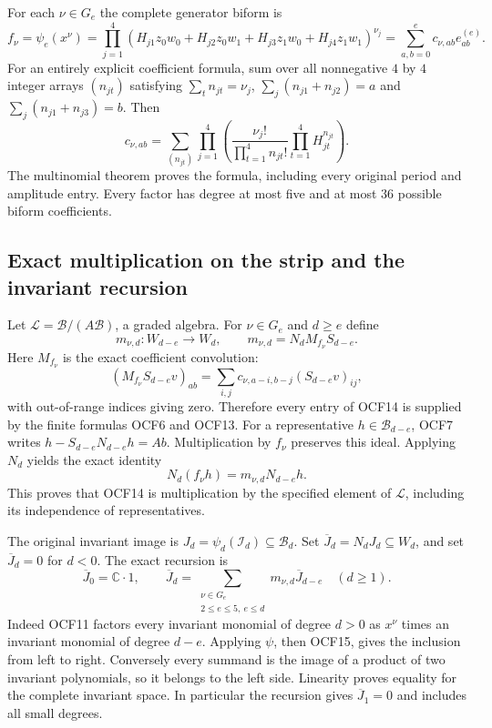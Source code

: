 \documentclass[11pt]{article}
\begin{document}
For each $\nu\in G_e$ the complete generator biform is
\[
 f_\nu=\psi_e(x^\nu)
  =\prod_{j=1}^4
   (H_{j1}z_0w_0+H_{j2}z_0w_1+
                  H_{j3}z_1w_0+H_{j4}z_1w_1)^{\nu_j}
  =\sum_{a,b=0}^e c_{\nu,ab}e_{ab}^{(e)}.
 \tag{OCF12}
\]
For an entirely explicit coefficient formula, sum over all
nonnegative $4$ by $4$ integer arrays $(n_{jt})$ satisfying
$\sum_t n_{jt}=\nu_j$,
$\sum_j(n_{j1}+n_{j2})=a$ and
$\sum_j(n_{j1}+n_{j3})=b$. Then
\[
 c_{\nu,ab}=
 \sum_{(n_{jt})}
     \prod_{j=1}^4\left(
        \frac{\nu_j!}{\prod_{t=1}^4n_{jt}!}
        \prod_{t=1}^4H_{jt}^{n_{jt}}\right).
 \tag{OCF13}
\]
The multinomial theorem proves the formula, including every
original period and amplitude entry. Every factor has degree at
most five and at most $36$ possible biform coefficients.

\subsection{Exact multiplication on the strip and the invariant recursion}

Let $\mathcal L=\mathcal B/(A\mathcal B)$, a graded algebra.
For $\nu\in G_e$ and $d\geq e$ define
\[
 m_{\nu,d}:W_{d-e}\longrightarrow W_d,
 \qquad m_{\nu,d}=N_d M_{f_\nu}S_{d-e}.
 \tag{OCF14}
\]
Here $M_{f_\nu}$ is the exact coefficient convolution:
\[
       (M_{f_\nu}S_{d-e}v)_{ab}
          =\sum_{i,j}c_{\nu,a-i,b-j}(S_{d-e}v)_{ij},
\]
with out-of-range indices giving zero.
Therefore every entry of OCF14 is supplied
by the finite formulas OCF6 and OCF13.
For a representative $h\in\mathcal B_{d-e}$, OCF7 writes
$h-S_{d-e}N_{d-e}h=A b$. Multiplication by $f_\nu$ preserves
this ideal. Applying $N_d$ yields the exact identity
\[
       N_d(f_\nu h)=m_{\nu,d}N_{d-e}h.
 \tag{OCF15}
\]
This proves that OCF14 is multiplication by the specified element
of $\mathcal L$, including its independence of representatives.

The original invariant image is
$J_d=\psi_d(\mathscr I_d)\subseteq\mathcal B_d$.
Set $\overline J_d=N_dJ_d\subseteq W_d$, and set
$\overline J_d=0$ for $d<0$. The exact recursion is
\[
 \overline J_0=\mathbb C\cdot1,\qquad
 \overline J_d=
   \sum_{\substack{\nu\in G_e\\2\leq e\leq5,\ e\leq d}}
                 m_{\nu,d}\overline J_{d-e}
                 \quad(d\geq1).
 \tag{OCF16}
\]
Indeed OCF11 factors every invariant monomial of degree $d>0$
as $x^\nu$ times an invariant monomial of degree $d-e$.
Applying $\psi$, then OCF15, gives the inclusion from left to
right. Conversely every summand is the image of a product of two
invariant polynomials, so it belongs to the left side. Linearity
proves equality for the complete invariant space. In particular
the recursion gives $\overline J_1=0$ and includes all small degrees.
\end{document}
